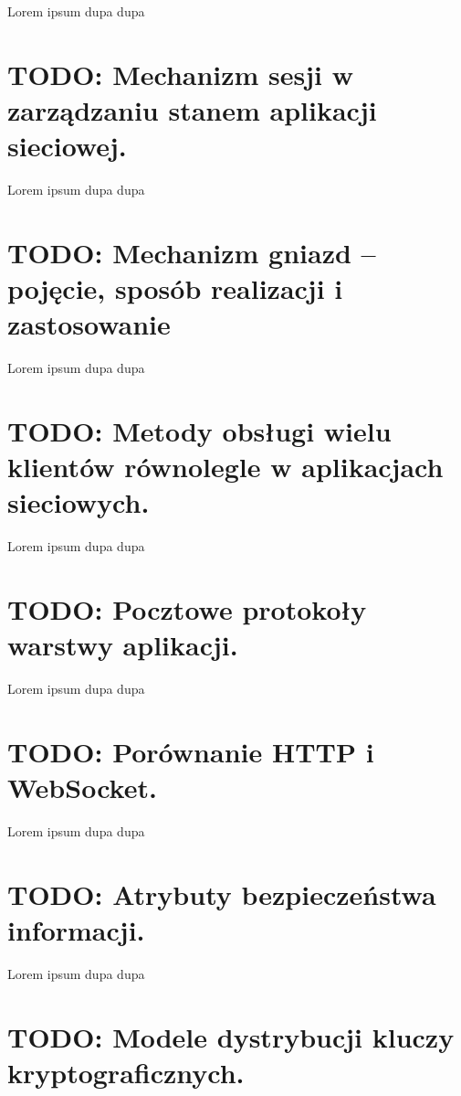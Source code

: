 \documentclass[a4paper,12pt,oneside]{book}
\begin{document}
		Lorem ipsum dupa dupa
		
		\setcounter{section}{57}
		\section{\color{red} TODO: Mechanizm sesji w zarządzaniu stanem aplikacji sieciowej. }
		
		Lorem ipsum dupa dupa
		
		\setcounter{section}{58}
		\section{\color{red} TODO: Mechanizm gniazd – pojęcie, sposób realizacji i zastosowanie }
		
		Lorem ipsum dupa dupa
		
		\setcounter{section}{59}
		\section{\color{red} TODO: Metody obsługi wielu klientów równolegle w aplikacjach sieciowych.}
		
		Lorem ipsum dupa dupa
		
		\setcounter{section}{60}
		\section{\color{red} TODO: Pocztowe protokoły warstwy aplikacji. }
		
		Lorem ipsum dupa dupa
		
		\setcounter{section}{61}
		\section{\color{red} TODO: Porównanie HTTP i WebSocket. }
		
		Lorem ipsum dupa dupa
		
		\setcounter{section}{62}
		\section{\color{red} TODO: Atrybuty bezpieczeństwa informacji. }
		
		Lorem ipsum dupa dupa
		
		\setcounter{section}{63}
		\section{\color{red} TODO: Modele dystrybucji kluczy kryptograficznych.}
		
\end{document}
